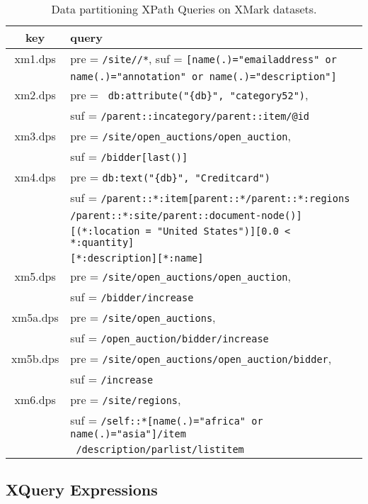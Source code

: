  \begin{table}[t]
 	\caption{Data partitioning XPath Queries on XMark datasets. }
 	\label{table:dpsqueries}
 	\footnotesize
 	\centering
 	\begin{tabular}{c|l}
 		\hline\hline
 		key      &  query\\
 		\hline\hline
 		xm1.dps & pre = \verb|/site//*|, suf = \verb|[name(.)="emailaddress" or| \\
 		        & \verb|name(.)="annotation" or name(.)="description"]| \\
 		\hline
 		xm2.dps & pre = \verb| db:attribute("{db}", "category52")|, \\
        		& suf = \verb|/parent::incategory/parent::item/@id| \\
  		\hline
 		xm3.dps & pre = \verb|/site/open_auctions/open_auction|,\\
 		&  suf = \verb|/bidder[last()]| \\
 		\hline
 		xm4.dps & pre = \verb|db:text("{db}", "Creditcard")| \\
 		& suf =  \verb|/parent::*:item[parent::*/parent::*:regions| \\
 		& \verb|/parent::*:site/parent::document-node()]| \\
 		& \verb|[(*:location = "United States")][0.0 < *:quantity]| \\
 		& \verb|[*:description][*:name]|\\
 		\hline
		xm5.dps & pre  = \verb|/site/open_auctions/open_auction|,\\
		& suf =  \verb|/bidder/increase|\\
		xm5a.dps & pre  = \verb|/site/open_auctions|,\\
		& suf =  \verb|/open_auction/bidder/increase|\\
		xm5b.dps & pre  = \verb|/site/open_auctions/open_auction/bidder|,\\
				& suf =  \verb|/increase|\\
 		\hline
 		xm6.dps & pre  = \verb|/site/regions|,\\
        & suf =  \verb|/self::*[name(.)="africa" or name(.)="asia"]/item|\\
        & \verb| /description/parlist/listitem|\\
 		\hline\hline
 	\end{tabular}
 \end{table}



\subsection{XQuery Expressions}
\label{app:xqueries}

